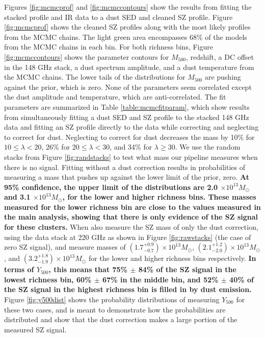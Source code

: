 \documentclass[a4paper,fleqn,usenatbib]{mnras}
\begin{document}
Figures \ref{fig:mcmcprof} and \ref{fig:mcmccontours} show the results from fitting the stacked profile and IR data to a dust SED and cleaned SZ profile. Figure \ref{fig:mcmcprof} shows the cleaned SZ profiles along with the most likely profiles from the MCMC chains. The light green area encompasses 68\% of the models from the MCMC chains in each bin.  For both richness bins, Figure \ref{fig:mcmccontours} shows the parameter contours for $M_{500}$, redshift, a DC offset in the 148 GHz stack, a dust spectrum amplitude, and a dust temperature from the MCMC chains. The lower tails of the distributions for $M_{500}$ are pushing against the prior, which is zero. None of the parameters seem correlated except the dust amplitude and temperature, which are anti-correlated. 
The fit parameters are summarized in Table \ref{table:mcmcfitparam}, which show results from simultaneously fitting a dust SED and SZ profile to the stacked 148 GHz data and fitting an SZ profile directly to the data while correcting and neglecting to correct for dust. Neglecting to correct for dust decreases the mass by 10\% for $10 \leq \lambda < 20$, 26\% for $20 \leq \lambda < 30$, and 34\% for $\lambda \geq 30$.
We use the random stacks from Figure \ref{fig:randstacks} to test what mass our pipeline measures when there is no signal. Fitting without a dust correction results in probabilities of measuring a mass that pushes up against the lower limit of the prior, zero. \textbf{At 95\% confidence, the upper limit of the distributions are 2.0 $\times 10^{13} M_{\odot}$ and 3.1 $\times 10^{13} M_{\odot}$, for the lower and higher richness bins. These masses measured for the lower richness bin are close to the values measured in the main analysis, showing that there is only evidence of the SZ signal for these clusters. }
When also measure the SZ mass of only the dust correction, using the data stack at 220 GHz as shown in Figure \ref{fig:rawstacks} (the case of zero SZ signal), and measure masses of $(1.7^{+0.9}_{-0.7}) \times 10^{13} M_{\odot}$, $(2.1^{+1.2}_{-2.0}) \times 10^{13} M_{\odot}$, and $(3.2^{+1.8}_{-1.9}) \times 10^{13} M_{\odot}$ for the lower and higher richness bins respectively. \textbf{In terms of $Y_{500}$, this means that 75\% $\pm$ 84\% of the SZ signal in the lowest richness bin, 60\% $\pm$ 67\% in the middle bin, and 52\% $\pm$ 40\% of the SZ signal in the highest richness bin is filled in by dust emission.} Figure \ref{fig:y500dist} shows the probability distributions of measuring $Y_{500}$ for these two cases, and is meant to demonstrate how the probabilities are distributed and show that the dust correction makes a large portion of the measured SZ signal. 
\end{document}
